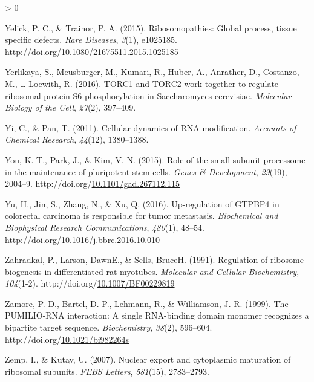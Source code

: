 \documentclass[12pt,oneside]{reedthesis}
\newlength{\cslhangindent}
\newenvironment{CSLReferences}[2] %
 {%
  \setlength{\parindent}{0pt}
  \ifodd #1 \everypar{\setlength{\hangindent}{\cslhangindent}}\ignorespaces\fi
  \ifnum #2 > 0
  \setlength{\parskip}{#2\baselineskip}
  \fi
 }%
 {}
\begin{document}
\begin{CSLReferences}{1}{0}
\leavevmode\hypertarget{ref-Yelick2015a}{}%
Yelick, P. C., \& Trainor, P. A. (2015). Ribosomopathies: {Global} process, tissue specific defects. \emph{Rare Diseases}, \emph{3}(1), e1025185. http://doi.org/\href{https://doi.org/10.1080/21675511.2015.1025185}{10.1080/21675511.2015.1025185}

\leavevmode\hypertarget{ref-Yerlikaya2016a}{}%
Yerlikaya, S., Meusburger, M., Kumari, R., Huber, A., Anrather, D., Costanzo, M., \ldots{} Loewith, R. (2016). {TORC1} and {TORC2} work together to regulate ribosomal protein {S6} phosphorylation in {Saccharomyces} cerevisiae. \emph{Molecular Biology of the Cell}, \emph{27}(2), 397--409.

\leavevmode\hypertarget{ref-Yi2011}{}%
Yi, C., \& Pan, T. (2011). Cellular dynamics of {RNA} modification. \emph{Accounts of Chemical Research}, \emph{44}(12), 1380--1388.

\leavevmode\hypertarget{ref-You2015}{}%
You, K. T., Park, J., \& Kim, V. N. (2015). Role of the small subunit processome in the maintenance of pluripotent stem cells. \emph{Genes \& Development}, \emph{29}(19), 2004--9. http://doi.org/\href{https://doi.org/10.1101/gad.267112.115}{10.1101/gad.267112.115}

\leavevmode\hypertarget{ref-yuUpregulationGTPBP4Colorectal2016}{}%
Yu, H., Jin, S., Zhang, N., \& Xu, Q. (2016). Up-regulation of {GTPBP4} in colorectal carcinoma is responsible for tumor metastasis. \emph{Biochemical and Biophysical Research Communications}, \emph{480}(1), 48--54. http://doi.org/\href{https://doi.org/10.1016/j.bbrc.2016.10.010}{10.1016/j.bbrc.2016.10.010}

\leavevmode\hypertarget{ref-zahradkalRegulationRibosomeBiogenesis1991}{}%
Zahradkal, P., Larson, DawnE., \& Sells, BruceH. (1991). Regulation of ribosome biogenesis in differentiated rat myotubes. \emph{Molecular and Cellular Biochemistry}, \emph{104}(1-2). http://doi.org/\href{https://doi.org/10.1007/BF00229819}{10.1007/BF00229819}

\leavevmode\hypertarget{ref-Zamore1999b}{}%
Zamore, P. D., Bartel, D. P., Lehmann, R., \& Williamson, J. R. (1999). The {PUMILIO}-{RNA} interaction: A single {RNA}-binding domain monomer recognizes a bipartite target sequence. \emph{Biochemistry}, \emph{38}(2), 596--604. http://doi.org/\href{https://doi.org/10.1021/bi982264s}{10.1021/bi982264s}

\leavevmode\hypertarget{ref-Zemp2007}{}%
Zemp, I., \& Kutay, U. (2007). Nuclear export and cytoplasmic maturation of ribosomal subunits. \emph{FEBS Letters}, \emph{581}(15), 2783--2793.


\end{CSLReferences}
\end{document}
